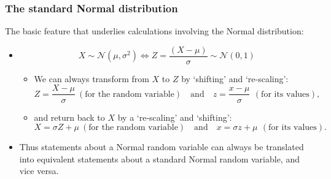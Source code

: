 \documentclass[notes=show,smaller,handout]{beamer}
\newcommand{\N}{\mathcal{N}}
\newenvironment{stepitemize}{\begin{itemize}[<+->]}{\end{itemize} }
\begin{document}
\begin{frame}%

\frametitle{The standard Normal distribution}

The basic feature that underlies calculations involving the Normal distribution:
\begin{stepitemize}
\item $$X\sim \N\left( \mu ,\sigma ^{2}\right)\Leftrightarrow Z=\frac{\left( X-\mu \right) }{\sigma }\sim \N\left( 0,1\right)$$
\begin{stepitemize}
\item We can always transform from $X$ to $Z$  by  `shifting' and `re-scaling':%
\begin{equation*}
Z=\frac{X-\mu }{\sigma } \ (\text{for the random variable}) \quad\mbox{and}\quad z=\frac{x-\mu }{\sigma }\,  \ (\text{for its values}) ,
\end{equation*}
\item and return back to $X$ by a `re-scaling' and `shifting':%
\begin{equation*}
X=\sigma Z+\mu  \ (\text{for the random variable}) \quad\mbox{and}\quad x=\sigma z+\mu\, \ (\text{for its values}) .
\end{equation*}
\end{stepitemize}
\item Thus statements about a Normal random variable can always be translated into equivalent statements about a standard Normal random variable, and vice versa.
\end{stepitemize}

\end{frame}%
\end{document}
